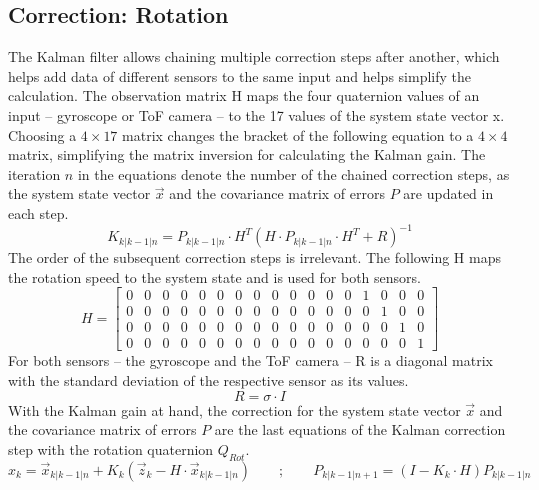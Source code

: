 \subsection{Correction: Rotation}
\label{sec:CorrectionRotation}
The Kalman filter allows chaining multiple correction steps after another, which helps add data of different sensors to the same input and helps simplify the calculation. The observation matrix H maps the four quaternion values of an input – gyroscope or ToF camera – to the 17 values of the system state vector x. Choosing a $4\times17$ matrix changes the bracket of the following equation to a $4\times4$ matrix, simplifying the matrix inversion for calculating the Kalman gain. The iteration $n$ in the equations denote the number of the chained correction steps, as the system state vector $\vec{x}$ and the covariance matrix of errors $P$ are updated in each step.
\begin{equation*}
    K_{k|k-1|n} = P_{k|k-1|n}\cdot H^{T}(H\cdot P_{k|k-1|n}\cdot H^{T}+R)^{-1}
\end{equation*}
The order of the subsequent correction steps is irrelevant. The following H maps the rotation speed to the system state and is used for both sensors.
\begin{equation*}
    H=
    \begin{bmatrix}
        0 & 0 & 0 & 0 & 0 & 0 & 0 & 0 & 0 & 0 & 0 & 0 & 0 & 1 & 0 & 0 & 0 \\
        0 & 0 & 0 & 0 & 0 & 0 & 0 & 0 & 0 & 0 & 0 & 0 & 0 & 0 & 1 & 0 & 0 \\
        0 & 0 & 0 & 0 & 0 & 0 & 0 & 0 & 0 & 0 & 0 & 0 & 0 & 0 & 0 & 1 & 0 \\
        0 & 0 & 0 & 0 & 0 & 0 & 0 & 0 & 0 & 0 & 0 & 0 & 0 & 0 & 0 & 0 & 1
    \end{bmatrix}
\end{equation*}
For both sensors – the gyroscope and the ToF camera – R is a diagonal matrix with the standard deviation of the respective sensor as its values.
\begin{equation*}
    R = \sigma \cdot I
\end{equation*}
With the Kalman gain at hand, the correction for the system state vector $\vec{x}$ and the covariance matrix of errors $P$ are the last equations of the Kalman correction step with the rotation quaternion $Q_{Rot}$. 
\begin{equation*}
    x_{k} = \vec{x}_{k|k-1|n}+K_{k}(\vec{z}_{k}-H\cdot \vec{x}_{k|k-1|n})
    \qquad ; \qquad
    P_{k|k-1|n+1}= (I-K_{k}\cdot H)P_{k|k-1|n}
\end{equation*}
